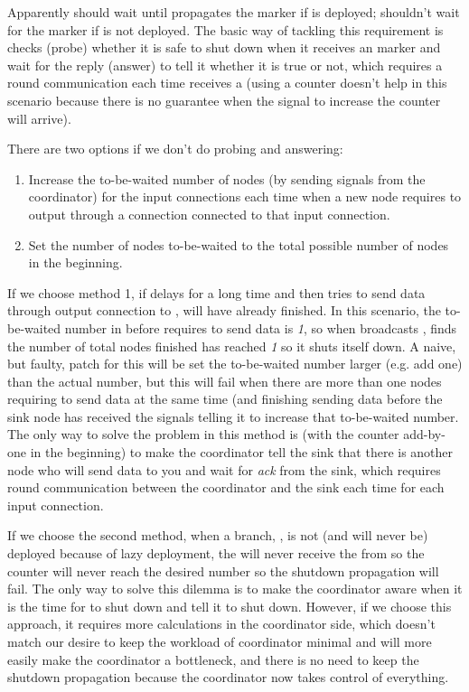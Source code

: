 Apparently \ndS should wait until \ndB propagates the \dEOS marker if \ndB is deployed; \ndS shouldn't wait for the \dEOS marker if \ndB is not deployed. The basic way of tackling this requirement is \ndS checks (\ie probe) whether it is safe to shut down when it receives an \dEOS marker and wait for the reply (\ie answer) to tell it whether it is true or not, which requires a round communication each time \ndS receives a \dEOS (using a counter doesn't help in this scenario because there is no guarantee when the signal to increase the counter will arrive).

There are two options if we don't do probing and answering:
\begin{enumerate}
	\item Increase the to-be-waited number of nodes (by sending signals from the coordinator) for the input connections each time when a new node requires to output through a connection connected to that input connection.
	\item Set the number of nodes to-be-waited to the total possible number of nodes in the beginning.
\end{enumerate}

If we choose method 1, if \ndB delays for a long time and then tries to send data through output connection to \ndS, \ndA will have already finished. In this scenario, the to-be-waited number in \ndS before \ndB requires to send data is \emph{1}, so when \ndA broadcasts \dEOS, \ndS finds the number of total nodes finished has reached \emph{1} so it shuts itself down. A naive, but faulty, patch for this will be set the to-be-waited number larger (e.g. add one) than the actual number, but this will fail when there are more than one nodes requiring to send data at the same time (and finishing sending data before the sink node has received the signals telling it to increase that to-be-waited number. The only way to solve the problem in this method is (with the counter add-by-one in the beginning) to make the coordinator tell the sink that there is another node who will send data to you and wait for \textit{ack} from the sink, which requires round communication between the coordinator and the sink each time for each input connection.

If we choose the second method, when a branch, \eg \ndB, is not (and will never be) deployed because of lazy deployment, the \ndS will never receive the \dEOS from \ndB so the counter will never reach the desired number so the shutdown propagation will fail. The only way to solve this dilemma is to make the coordinator aware when it is the time for \ndS to shut down and tell it to shut down. However, if we choose this approach, it requires more calculations in the coordinator side, which doesn't match our desire to keep the workload of coordinator minimal and will more easily make the coordinator a bottleneck, and there is no need to keep the shutdown propagation because the coordinator now takes control of everything.

